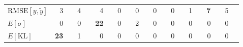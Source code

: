 {\begin{tabular}{lr@{ / }lr@{ / }lr@{ / }lr@{ / }lr@{ / }lr@{ / }lr@{ / }lr@{ / }lr@{ / }lr@{ / }l}
$\text{RMSE}[y,\tilde{y}]$ & {3}&{\color{gray}{4}} & {4}&{\color{gray}{7}} & {4}&{\color{gray}{4}} & {0}&{\color{gray}{0}} & {0}&{\color{gray}{0}} & {0}&{\color{gray}{0}} & {0}&{\color{gray}{0}} & {1}&{\color{gray}{3}} & {\textbf{7}}&{\color{gray}{8}} & {5}&{\color{gray}{10}} \\
$E[\sigma]$ & {0}&{\color{gray}{0}} & {0}&{\color{gray}{0}} & {\textbf{22}}&{\color{gray}{60}} & {0}&{\color{gray}{0}} & {2}&{\color{gray}{2}} & {0}&{\color{gray}{0}} & {0}&{\color{gray}{0}} & {0}&{\color{gray}{0}} & {0}&{\color{gray}{0}} & {0}&{\color{gray}{0}} \\
$E[\text{KL}]$ & {\textbf{23}}&{\color{gray}{14}} & {1}&{\color{gray}{0}} & {0}&{\color{gray}{0}} & {0}&{\color{gray}{0}} & {0}&{\color{gray}{0}} & {0}&{\color{gray}{0}} & {0}&{\color{gray}{0}} & {0}&{\color{gray}{0}} & {0}&{\color{gray}{0}} & {0}&{\color{gray}{0}} \\
\bottomrule
\end{tabular}
}